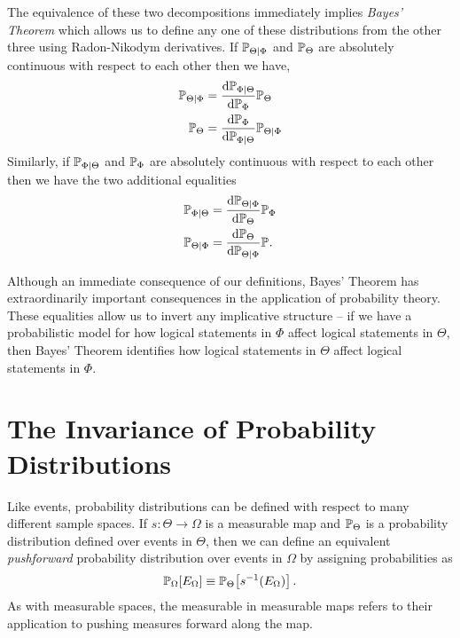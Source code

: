 The equivalence of these two decompositions immediately implies
\emph{Bayes' Theorem} which allows us to define any one of these
distributions from the other three using Radon-Nikodym derivatives. 
If $\mathbb{P}_{\Theta \mid \Phi}$ and $\mathbb{P}_{\Theta}$ are absolutely continuous
with respect to each other then we have,
%
\begin{align*}
\mathbb{P}_{\Theta \mid \Phi} &= 
\frac{ \mathrm{d} \mathbb{P}_{\Phi \mid \Theta} }{ \mathrm{d} \mathbb{P}_{\Phi} }
\mathbb{P}_{ \Theta}
\\
\mathbb{P}_{\Theta} &= 
\frac{ \mathrm{d} \mathbb{P}_{\Phi} }{ \mathrm{d} \mathbb{P}_{\Phi \mid \Theta} }
\mathbb{P}_{ \Theta \mid \Phi }
\end{align*}
%
Similarly, if $\mathbb{P}_{\Phi \mid \Theta}$ and $\mathbb{P}_{\Phi}$ are absolutely 
continuous with respect to each other then we have the two additional
equalities
%
\begin{align*}
\mathbb{P}_{\Phi \mid \Theta} &= 
\frac{ \mathrm{d} \mathbb{P}_{\Theta \mid \Phi} }{ \mathrm{d} \mathbb{P}_{\Theta} }
\mathbb{P}_{\Phi}
\\
\mathbb{P}_{\Theta \mid \Phi} &= 
\frac{ \mathrm{d} \mathbb{P}_{\Theta} }{ \mathrm{d} \mathbb{P}_{\Theta \mid \Phi} }
\mathbb{P}_{ }.
\end{align*}

Although an immediate consequence of our definitions, Bayes' Theorem
has extraordinarily important consequences in the application of
probability theory.  These equalities allow us to invert any implicative 
structure -- if we have a probabilistic model for how logical statements
in $\Phi$ affect logical statements in $\Theta$, then Bayes' Theorem
identifies how logical statements in $\Theta$ affect logical statements
in $\Phi$.

\section{The Invariance of Probability Distributions}

Like events, probability distributions can be defined with respect to many different 
sample spaces.  If $s : \Theta \rightarrow \Omega$ is a measurable map and 
$\mathbb{P}_{\Theta}$ is a probability distribution defined over events in $\Theta$, then 
we can define an equivalent \emph{pushforward} probability distribution over 
events in $\Omega$ by assigning probabilities as
%
\begin{equation*}
\mathbb{P}_{\Omega} \! \left[ E_{\Omega} \right]
\equiv
\mathbb{P}_{\Theta} \! \left[ s^{-1} \! \left( E_{\Omega} \right) \right].
\end{equation*}
%
As with measurable spaces, the measurable in measurable maps refers to
their application to pushing measures forward along the map.

